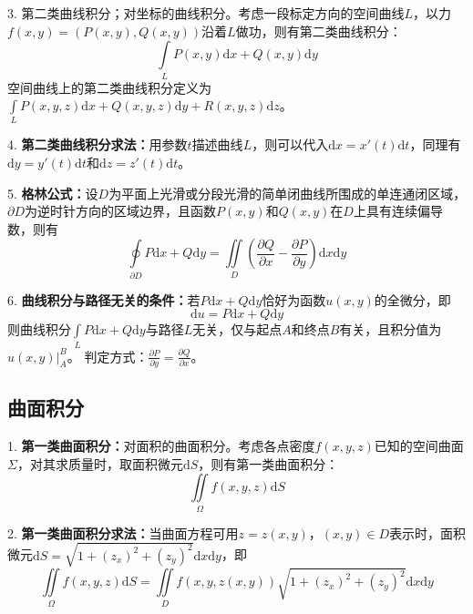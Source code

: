 3. 第二类曲线积分；对坐标的曲线积分。考虑一段标定方向的空间曲线$L$，以力$f(x,y)=\left(P(x,y),Q(x,y)\right)$沿着$L$做功，则有第二类曲线积分：
\begin{equation*}
    \int\limits_L P(x,y)\mathrm{d}x+Q(x,y)\mathrm{d}y
\end{equation*}
空间曲线上的第二类曲线积分定义为$\int\limits_L P(x,y,z)\mathrm{d}x+Q(x,y,z)\mathrm{d}y+R(x,y,z)\mathrm{d}z$。

4. \textbf{第二类曲线积分求法：}用参数$t$描述曲线$L$，则可以代入$\mathrm{d}x=x'(t)\mathrm{d}t$，同理有$\mathrm{d}y=y'(t)\mathrm{d}t$和$\mathrm{d}z=z'(t)\mathrm{d}t$。

5. \textbf{格林公式：}设$D$为平面上光滑或分段光滑的简单闭曲线所围成的单连通闭区域，$\partial D$为逆时针方向的区域边界，且函数$P(x,y)$和$Q(x,y)$在$D$上具有连续偏导数，则有
\begin{equation*}
    \oint\limits_{\partial D}P\mathrm{d}x+Q\mathrm{d}y=\iint\limits_{D}\left(\frac{\partial Q}{\partial x}-\frac{\partial P}{\partial y}\right)\mathrm{d}x\mathrm{d}y
\end{equation*}

6. \textbf{曲线积分与路径无关的条件：}若$P \mathrm{d}x +Q\mathrm{d}y$恰好为函数$u(x,y)$的全微分，即
\begin{equation*}
    \mathrm{d}u=P\mathrm{d}x+Q\mathrm{d}y
\end{equation*}
则曲线积分$\int\limits_{L}P\mathrm{d}x+Q\mathrm{d}y$与路径$L$无关，仅与起点$A$和终点$B$有关，且积分值为$u(x,y)\big|_A^B$。
判定方式：$\frac{\partial P}{\partial y}=\frac{\partial Q}{\partial x}$。

\subsection{曲面积分}

1. \textbf{第一类曲面积分：}对面积的曲面积分。考虑各点密度$f(x,y,z)$已知的空间曲面$\Sigma$，对其求质量时，取面积微元$\mathrm{d}S$，则有第一类曲面积分：
\begin{equation*}
    \iint\limits_{\Omega}f(x,y,z)\mathrm{d}S
\end{equation*}

2. \textbf{第一类曲面积分求法：}当曲面方程可用$z=z(x,y)$，$(x,y)\in D$表示时，面积微元$\mathrm{d}S =\sqrt{1+(z_x)^2+(z_y)^2}\mathrm{d}x\mathrm{d}y$，即
\begin{equation*}
    \iint\limits_{\Omega}f(x,y,z)\mathrm{d}S=\iint\limits_D f\left(x,y,z(x,y)\right)\sqrt{1+(z_x)^2+(z_y)^2}\mathrm{d}x\mathrm{d}y
\end{equation*}

